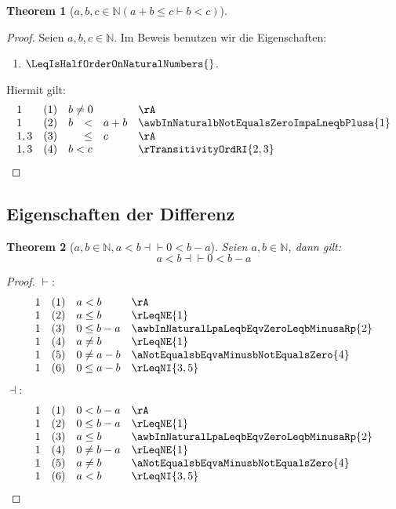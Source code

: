\documentclass{book}
\theoremstyle{plain}
\newtheorem{theorem}{Theorem}
\theoremstyle{remark}
\theoremstyle{definition}
\begin{document}
\label{awbwcInNaturalLpaPlusbLeqcImpbLneqcRp}
\begin{theorem}[\(a,b,c\in\mathbb{N}(a+b\leq c\vdash b<c)\)]
\end{theorem}
\begin{proof}
        Seien \(a,b,c\in\mathbb{N}\). Im Beweis benutzen wir die Eigenschaften:
\begin{enumerate}
    \item \(\LeqIsHalfOrderOnNaturalNumbers{}\).
\end{enumerate}
Hiermit gilt:
\[
\begin{array}{llclll}
            1 & (1) & \multicolumn{3}{l}{b\neq 0}  & \rA \\
            1 & (2) & b&<& a+b  & \awbInNaturalbNotEqualsZeroImpaLneqbPlusa{1} \\
            1,3 & (3) &  &\leq &c & \rA \\
            1,3 & (4) & \multicolumn{3}{l}{b<c} & \rTransitivityOrdRI{2,3} \\
\end{array}
\]
\end{proof}

\subsection{Eigenschaften der Differenz}

\label{awbInNaturalLpaLneqbEqvZeroLneqbMinusaRp}
\begin{theorem}[\(a,b\in\mathbb{N},a<b\dashv\vdash 0<b-a\)]
Seien \(a,b\in\mathbb{N}\), dann gilt:
\[a<b\dashv\vdash 0<b-a\]
\end{theorem}
\begin{proof}
    \(\vdash\):
    \[
    \begin{array}{llll}
        1 & (1) & a<b  & \rA \\
        1 & (2) & a\leq b  & \rLeqNE{1} \\
        1 & (3) & 0\leq b-a  & \awbInNaturalLpaLeqbEqvZeroLeqbMinusaRp{2} \\
        1 & (4) & a\neq b  & \rLeqNE{1} \\
        1 & (5) & 0\neq a-b  & \aNotEqualsbEqvaMinusbNotEqualsZero{4} \\
        1 & (6) & 0\leq a-b  & \rLeqNI{3,5} \\
    \end{array}
    \]
    \(\dashv\):
    \[
    \begin{array}{llll}
        1 & (1) & 0<b-a  & \rA \\
        1 & (2) & 0\leq b-a  & \rLeqNE{1} \\
        1 & (3) & a\leq b  & \awbInNaturalLpaLeqbEqvZeroLeqbMinusaRp{2} \\
        1 & (4) & 0\neq b-a  & \rLeqNE{1} \\
        1 & (5) & a\neq b  & \aNotEqualsbEqvaMinusbNotEqualsZero{4} \\
        1 & (6) & a<b  & \rLeqNI{3,5} \\
    \end{array}
    \]
\end{proof}
\end{document}

